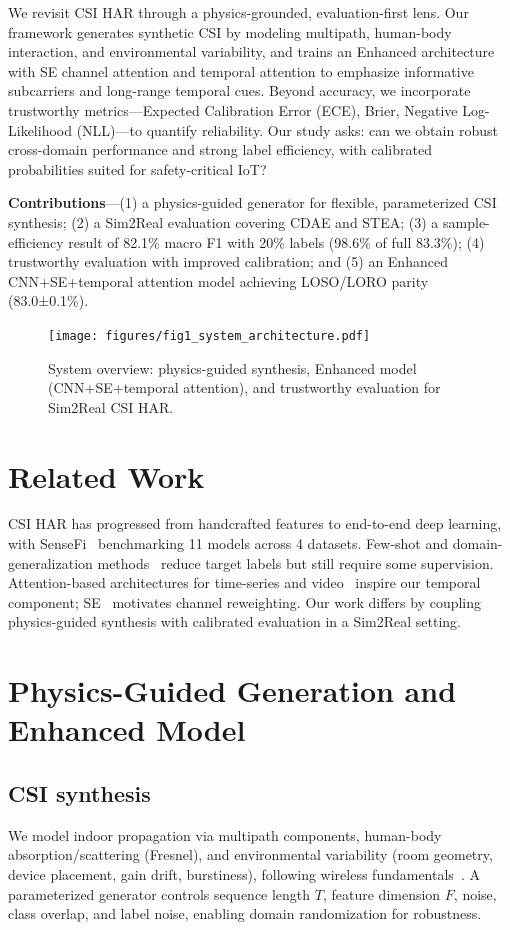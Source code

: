 \documentclass[journal]{IEEEtran}
\begin{document}
We revisit CSI HAR through a physics-grounded, evaluation-first lens. Our framework generates synthetic CSI by modeling multipath, human-body interaction, and environmental variability, and trains an Enhanced architecture with SE channel attention and temporal attention to emphasize informative subcarriers and long-range temporal cues. Beyond accuracy, we incorporate trustworthy metrics—Expected Calibration Error (ECE), Brier, Negative Log-Likelihood (NLL)—to quantify reliability. Our study asks: can we obtain robust cross-domain performance and strong label efficiency, with calibrated probabilities suited for safety-critical IoT?

\textbf{Contributions}—(1) a physics-guided generator for flexible, parameterized CSI synthesis; (2) a Sim2Real evaluation covering CDAE and STEA; (3) a sample-efficiency result of 82.1\% macro F1 with 20\% labels (98.6\% of full 83.3\%); (4) trustworthy evaluation with improved calibration; and (5) an Enhanced CNN+SE+temporal attention model achieving LOSO/LORO parity (83.0±0.1\%).

\begin{figure}[t]
\centering
\texttt{[image: figures/fig1\_system\_architecture.pdf]}
\caption{System overview: physics-guided synthesis, Enhanced model (CNN+SE+temporal attention), and trustworthy evaluation for Sim2Real CSI HAR.}
\label{fig:overview}
\end{figure}

\section{Related Work}
CSI HAR has progressed from handcrafted features to end-to-end deep learning, with SenseFi~\cite{yang2023sensefi} benchmarking 11 models across 4 datasets. Few-shot and domain-generalization methods~\cite{fewsense2022,airfi2022} reduce target labels but still require some supervision. Attention-based architectures for time-series and video~\cite{li2020tea,bertasius2021timesformer,lim2021tft,zhou2021informer} inspire our temporal component; SE~\cite{se_networks2018} motivates channel reweighting. Our work differs by coupling physics-guided synthesis with calibrated evaluation in a Sim2Real setting.

\section{Physics-Guided Generation and Enhanced Model}
\subsection{CSI synthesis}
We model indoor propagation via multipath components, human-body absorption/scattering (Fresnel), and environmental variability (room geometry, device placement, gain drift, burstiness), following wireless fundamentals~\cite{goldsmith2005wireless}. A parameterized generator controls sequence length $T$, feature dimension $F$, noise, class overlap, and label noise, enabling domain randomization for robustness.
\end{document}
